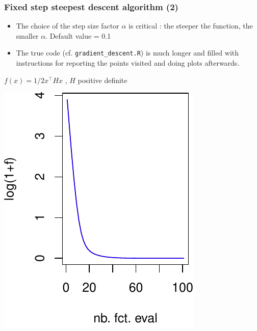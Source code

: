 \documentclass[12pt]{beamer}
\begin{document}
\begin{frame}
\frametitle{Fixed step steepest descent algorithm (2)} 
\begin{itemize}
\item The choice of the step size factor $\alpha$ is critical : the steeper the function, the smaller $\alpha$. Default value = 0.1
\item The true code (cf. \texttt{gradient\_descent.R}) is much longer and filled with instructions for reporting the points visited and doing plots afterwards.
\end{itemize}
\vspace{-0.5cm}
\begin{center}
{\scriptsize $f(x) = 1/2 x^\top H x$ , $H$ positive definite}\\
\begin{minipage}[b]{0.3\textwidth}
\includegraphics[width=\textwidth]{gradient_quad_2d_f_alpha01-crop.pdf} 
\end{minipage}
\hspace{1.5cm}

\end{center}
\end{frame}
\end{document}
